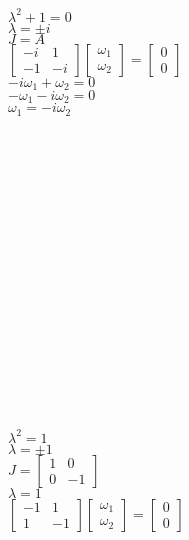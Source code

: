 \begin{multicols}{2}\noindent
$\lambda^2+1=0$\\
$\lambda = \pm i$\\
$J=A$\\
$\left[\begin{array}{cc}-i&1\\-1&-i\end{array}\right]\left[\begin{array}{c}\omega_1\\ \omega_2\end{array}\right]=\left[\begin{array}{c}0\\0\end{array}\right]$\\
$-i\omega_1+\omega_2 =0$\\
$-\omega_1-i\omega_2=0$\\
$\omega_1=-i\omega_2$
\\\\\\\\\\\\\\\\\\\\\\\\\\\\\\\\\\
$\lambda^2=1$\\
$\lambda = \pm 1$\\
$J=\left[\begin{array}{cc}1&0\\0&-1\end{array}\right]$\\
$\boxed{\lambda=1}$\\
$\left[\begin{array}{cc}-1&1\\1&-1\end{array}\right]\left[\begin{array}{c}\omega_1\\ \omega_2\end{array}\right]=\left[\begin{array}{c}0\\0\end{array}\right]$\\

\end{multicols}
